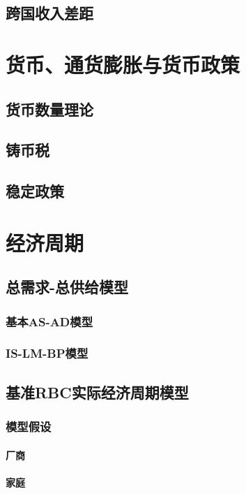 \subsection{跨国收入差距}

\section{货币、通货膨胀与货币政策}
\subsection{货币数量理论}

\subsection{铸币税}

\subsection{稳定政策}


\section{经济周期}
\subsection{总需求-总供给模型}
\subsubsection{基本AS-AD模型}

\subsubsection{IS-LM-BP模型}

\subsection{基准RBC实际经济周期模型}
\subsubsection{模型假设}
\paragraph*{厂商}

\paragraph*{家庭}

